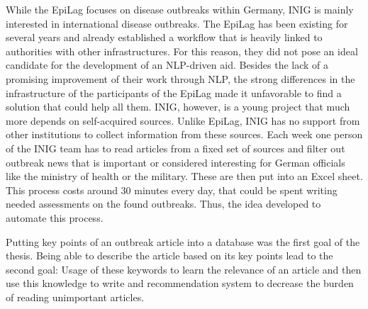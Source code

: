 While the EpiLag focuses on disease outbreaks within Germany, INIG is mainly interested in international disease outbreaks. The
EpiLag has been existing for several years and already established a workflow that is heavily linked to authorities with other infrastructures. For this reason, they did not pose an ideal candidate for the development of an NLP-driven aid. Besides the lack of a promising improvement of their work through NLP, the strong differences in the infrastructure of the participants of the EpiLag made it unfavorable to find a solution that could help all them.
INIG, however, is a young project that much more depends on self-acquired sources. Unlike EpiLag, INIG
has no support from other institutions to collect information from these sources.
Each week one person of the INIG team has to read articles from a fixed set of sources and filter out outbreak news that is
important or considered interesting for German officials like the ministry of health or the military. These are then put into an Excel sheet. This process costs around 30 minutes
every day, that could be spent writing needed assessments on the found outbreaks. Thus, the idea developed to automate this process.

Putting key points of an outbreak article
into a database was the first goal of the thesis. Being able to describe the article based on its key points lead to the second goal: Usage of these keywords to learn the relevance of an article and then use this knowledge to write
and recommendation system to decrease the burden of reading unimportant articles.
